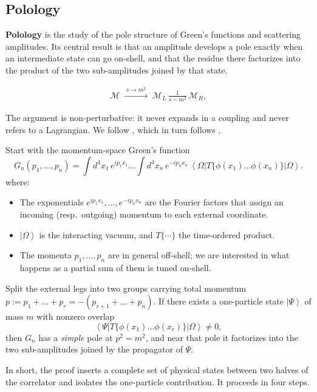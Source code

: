 \subsection{Polology}
\label{sec:polology}

\textbf{Polology} is the study of the pole structure of Green's functions and scattering amplitudes. Its central result is that an amplitude develops a pole exactly when an intermediate state can go on-shell, and that the residue there factorizes into the product of the two sub-amplitudes joined by that state. 

\begin{align}
    \label{eq:factorization}
    \mathcal{M} \;\xrightarrow{\;s \to m^2\;}\;
    \mathcal{M}_L \,\frac{1}{s - m^2}\, \mathcal{M}_R,
\end{align}

The argument is non-perturbative: it never expands in a coupling and never refers to a Lagrangian. We follow \autocite[\S24.3]{schwartzQFT2014}, which in turn follows \autocite[\S10.2]{weinbergQFT1995}.

Start with the momentum-space Green's function
\[
	G_n(p_1, \ldots, p_n) = \int d^4 x_1\, e^{i p_1 x_1} \ldots \int  d^4 x_n\, e^{- i p_n x_n}\, \left\langle \Omega | T \{\phi(x_1) \ldots \phi(x_n)\} | \Omega \right\rangle
.\]
where:
\begin{itemize}
	\item The exponentials $e^{i p_1 x_1}, \ldots, e^{- i p_n x_n }$ are the Fourier factors that assign an incoming (resp.\ outgoing) momentum to each external coordinate.
	\item $\left| \Omega \right\rangle$ is the interacting vacuum, and $T\{\cdots\}$ the time-ordered product.
	\item The momenta $p_1, \ldots, p_n$ are in general off-shell; we are interested in what happens as a partial sum of them is tuned on-shell.
\end{itemize}

\begin{theorem}[Polology]
	Split the external legs into two groups carrying total momentum $p := p_1 + \ldots + p_r = -(p_{r + 1} + \ldots + p_n)$. If there exists a one-particle state $\left| \Psi \right\rangle $ of mass $m$ with nonzero overlap
	\[
		\left\langle \Psi \right| T\{\phi(x_1) \ldots \phi(x_r)\} \left| \Omega \right\rangle \neq 0
	,\]
	then $G_n$ has a \emph{simple} pole at $p^2 = m^2$, and near that pole it factorizes into the two sub-amplitudes joined by the propagator of $\Psi$.
\end{theorem}
In short, the proof inserts a complete set of physical states between two halves of the correlator and isolates the one-particle contribution. It proceeds in four steps.


